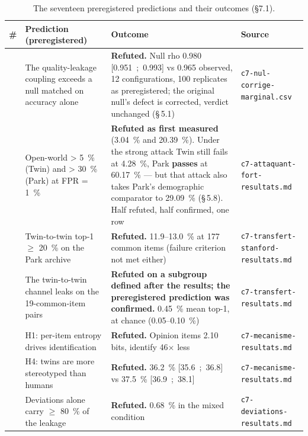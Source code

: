 \documentclass[sigconf,anonymous,review]{acmart}
\begin{document}
\begin{table}[t]
  \small
  \caption{The seventeen preregistered predictions and their outcomes (\S7.1).}
  \label{tab:predictions}
  \setlength{\tabcolsep}{3pt}
  \begin{tabular}{@{}>{\raggedright\arraybackslash}p{}>{\raggedright\arraybackslash}p{}>{\raggedright\arraybackslash}p{}>{\raggedright\arraybackslash}p{}@{}}
    \toprule
    \# & Prediction (preregistered) & Outcome & Source \\
    \midrule
    1 & The quality-leakage coupling exceeds a null matched on accuracy alone & \textbf{Refuted.} Null rho 0.980 [0.951~;~0.993] vs 0.965 observed, 12 configurations, 100 replicates as preregistered; the original null's defect is corrected, verdict unchanged (\S\,5.1) & \texttt{c7-\allowbreak{}nul-\allowbreak{}corrige-\allowbreak{}marginal\allowbreak{}.csv} \\
    2 & Open-world > 5~\% (Twin) and > 30~\% (Park) at FPR = 1~\% & \textbf{Refuted as first measured} (3.04~\% and 20.39~\%). Under the strong attack Twin still fails at 4.28~\%, Park \textbf{passes} at 60.17~\% --- but that attack also takes Park's demographic comparator to 29.09~\% (\S\,5.8). Half refuted, half confirmed, one row & \texttt{c7-\allowbreak{}attaquant-\allowbreak{}fort-\allowbreak{}resultats\allowbreak{}.md} \\
    3 & Twin-to-twin top-1 $\geq$ 20~\% on the Park archive & \textbf{Refuted.} 11.9--13.0~\% at 177 common items (failure criterion not met either) & \texttt{c7-\allowbreak{}transfert-\allowbreak{}stanford-\allowbreak{}resultats\allowbreak{}.md} \\
    4 & The twin-to-twin channel leaks on the 19-common-item pairs & \textbf{Refuted on a subgroup defined after the results; the preregistered prediction was confirmed.} 0.45~\% mean top-1, at chance (0.05--0.10~\%) & \texttt{c7-\allowbreak{}transfert-\allowbreak{}resultats\allowbreak{}.md} \\
    5 & H1: per-item entropy drives identification & \textbf{Refuted.} Opinion items 2.10 bits, identify 46$\times$ less & \texttt{c7-\allowbreak{}mecanisme-\allowbreak{}resultats\allowbreak{}.md} \\
    6 & H4: twins are more stereotyped than humans & \textbf{Refuted.} 36.2~\% [35.6~;~36.8] vs 37.5~\% [36.9~;~38.1] & \texttt{c7-\allowbreak{}mecanisme-\allowbreak{}resultats\allowbreak{}.md} \\
    7 & Deviations alone carry $\geq$ 80~\% of the leakage & \textbf{Refuted.} 0.68~\% in the mixed condition & \texttt{c7-\allowbreak{}deviations-\allowbreak{}resultats\allowbreak{}.md} \\

\end{tabular}
\end{table}
\end{document}
